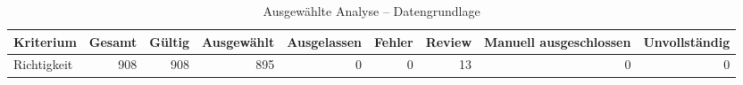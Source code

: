 \begin{table}[htbp]
\centering
\caption{Ausgewählte Analyse -- Datengrundlage}
\begin{tabular}{lrrrrrrrr}
\toprule
Kriterium & Gesamt & Gültig & Ausgewählt & Ausgelassen & Fehler & Review & Manuell ausgeschlossen & Unvollständig \\
\midrule
Richtigkeit & 908 & 908 & 895 & 0 & 0 & 13 & 0 & 0 \\
\bottomrule
\end{tabular}
\end{table}
